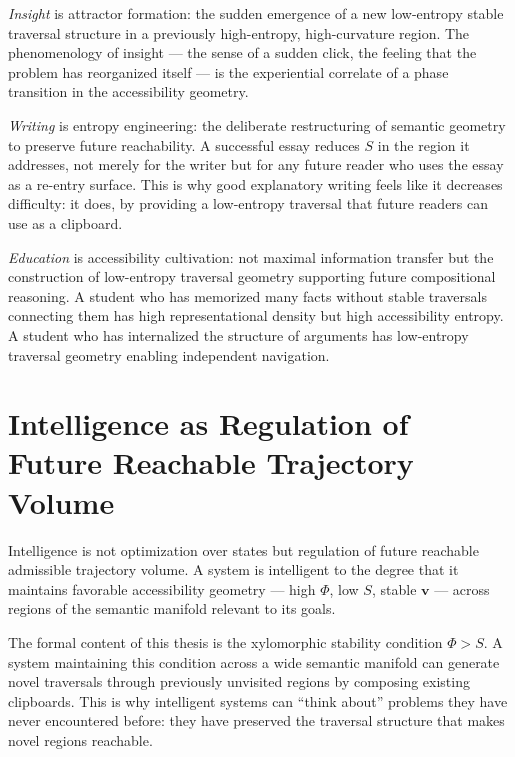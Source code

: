 \documentclass[12pt,oneside]{book}
\newcounter{thesisctr}
\newenvironment{thesis}[1][]{%
  \refstepcounter{thesisctr}%
  \begin{tcolorbox}[
    enhanced,
    breakable,
    colback=cliplight,
    colframe=clipblue,
    fonttitle=\bfseries\small,
    title={Thesis~\thethesisctr\ifx&#1&\else~(#1)\fi},
    left=6pt, right=6pt, top=4pt, bottom=4pt,
    arc=2pt
  ]
}{%
  \end{tcolorbox}
}
\theoremstyle{plain}
\theoremstyle{definition}
\theoremstyle{plain}
\begin{document}
\emph{Insight} is attractor formation: the sudden emergence of a new low-entropy stable traversal structure in a previously high-entropy, high-curvature region. The phenomenology of insight — the sense of a sudden click, the feeling that the problem has reorganized itself — is the experiential correlate of a phase transition in the accessibility geometry.

\emph{Writing} is entropy engineering: the deliberate restructuring of semantic geometry to preserve future reachability. A successful essay reduces $S$ in the region it addresses, not merely for the writer but for any future reader who uses the essay as a re-entry surface. This is why good explanatory writing feels like it decreases difficulty: it does, by providing a low-entropy traversal that future readers can use as a clipboard.

\emph{Education} is accessibility cultivation: not maximal information transfer but the construction of low-entropy traversal geometry supporting future compositional reasoning. A student who has memorized many facts without stable traversals connecting them has high representational density but high accessibility entropy. A student who has internalized the structure of arguments has low-entropy traversal geometry enabling independent navigation.

\section{Intelligence as Regulation of Future Reachable Trajectory Volume}

\begin{thesis}[Intelligence as Trajectory Volume Regulation]
Intelligence is not optimization over states but regulation of future reachable admissible trajectory volume. A system is intelligent to the degree that it maintains favorable accessibility geometry — high $\Phi$, low $S$, stable $\mathbf{v}$ — across regions of the semantic manifold relevant to its goals.
\end{thesis}

The formal content of this thesis is the xylomorphic stability condition $\Phi > S$. A system maintaining this condition across a wide semantic manifold can generate novel traversals through previously unvisited regions by composing existing clipboards. This is why intelligent systems can ``think about'' problems they have never encountered before: they have preserved the traversal structure that makes novel regions reachable.
\end{document}

